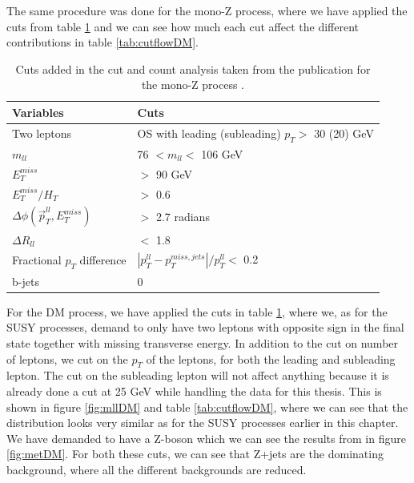 The same procedure was done for the mono-Z process, where we have applied the cuts from table \ref{tab:cutsDM} and we can see how much each cut affect the different contributions in table \ref{tab:cutflowDM}. 


\begin{table}[H]
    \centering
    \begin{tabular}{l l}\toprule
    \textbf{Variables} & \textbf{Cuts}\\
    \midrule
    \midrule
    Two leptons     &  OS with leading (subleading) $p_T >$ 30 (20) GeV\\
    $m_{ll}$     & 76 $< m_{ll} <$ 106 GeV\\
    $E_T^{miss}$ & $>$ 90 GeV\\
    $E_T^{miss}/H_T$ & $>$ 0.6\\
    $\Delta \phi (\Vec{p}_T^{ll}, E_T^{miss})$ & $>$ 2.7 radians\\
    $\Delta R_{ll}$ & $<$ 1.8\\
    Fractional $p_T$ difference & $|p_T^{ll} - p_T^{miss, jets}|/p_T^{ll} <$ 0.2\\
    b-jets & 0\\
    \bottomrule
     \end{tabular}
    \caption{Cuts added in the cut and count analysis taken from the publication for the mono-Z process \cite{monoZexclusion}.}
    \label{tab:cutsDM}
\end{table}

For the DM process, we have applied the cuts in table \ref{tab:cutsDM}, where we, as for the SUSY processes, demand to only have two leptons with opposite sign in the final state together with missing transverse energy. In addition to the cut on number of leptons, we cut on the $p_T$ of the leptons, for both the leading and subleading lepton. The cut on the subleading lepton will not affect anything because it is already done a cut at 25 GeV while handling the data for this thesis. This is shown in figure \ref{fig:mllDM} and table \ref{tab:cutflowDM}, where we can see that the distribution looks very similar as for the SUSY processes earlier in this chapter. We have demanded to have a Z-boson which we can see the results from in figure \ref{fig:metDM}. For both these cuts, we can see that Z+jets are the dominating background, where all the different backgrounds are reduced. 

